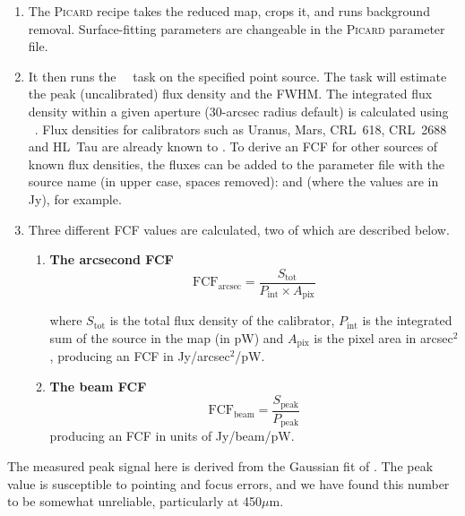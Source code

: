 \begin{enumerate}
\item The \textsc{Picard} recipe  takes the
  reduced map, crops it, and runs background removal. Surface-fitting
  parameters are changeable in the \textsc{Picard} parameter file.

\item It then runs the \Kappa\ \beamfit\ task on the specified point
  source. The  task will estimate the peak
  (uncalibrated) flux density and the FWHM. The integrated flux
  density within a given aperture (30-arcsec radius default) is
  calculated using \photom\ \autophotom. Flux densities for
  calibrators such as Uranus, Mars, CRL~618, CRL~2688 and HL~Tau are
  already known to \picard. To derive an FCF for other sources of
  known flux densities, the fluxes can be added to the parameter file
  with the source name (in upper case, spaces
  removed): 
  and  (where the values are in Jy),
  for example.

\item Three different FCF values are calculated, two of which are
  described below.

  \begin{enumerate}

  \item \textbf{The arcsecond FCF}
    \begin{equation}
      \label{eq:fcf_arcsec}
      \mathrm{FCF_{arcsec}} = \frac{S_{\mathrm{tot}}}{P_{\mathrm{int}} \times
        A_{\mathrm{pix}}}
    \end{equation}

    where $S_{\mathrm{tot}}$ is the total flux density of the
    calibrator, $P_{\mathrm{int}}$ is the integrated sum of the source
    in the map (in pW) and $A_{\mathrm{pix}}$ is the pixel area in
    arcsec$^2$, producing an FCF in Jy/arcsec$^2$/pW.

  \item\textbf{The beam FCF}
    \begin{equation}
      \label{eq:fcf_beam}
      \mathrm{FCF_{beam}} = \frac{S_{\mathrm{peak}}}{P_{\mathrm{peak}}}
    \end{equation}
    producing an FCF in units of Jy/beam/pW.
  \end{enumerate}

\end{enumerate}

The measured peak signal here is derived from the Gaussian fit of
. The peak value is susceptible to pointing and focus
errors, and we have found this number to be somewhat unreliable,
particularly at 450$\mu$m.


